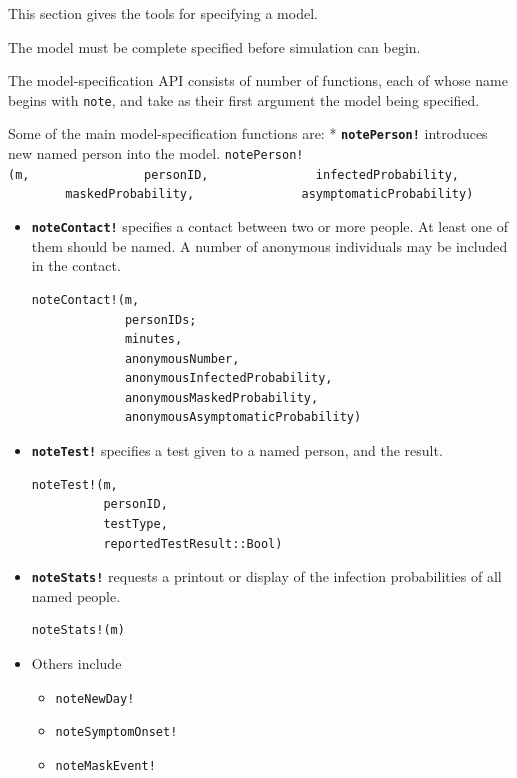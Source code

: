 \documentclass[11pt]{article}
\providecommand{\tightlist}{%
      \setlength{\itemsep}{0pt}\setlength{\parskip}{0pt}}
\begin{document}
This section gives the tools for specifying a model.

The model must be complete specified before simulation can begin.

The model-specification API consists of number of functions, each of
whose name begins with \texttt{note}, and take as their first argument
the model being specified.

Some of the main model-specification functions are: *
\textbf{\texttt{notePerson!}} introduces new named person into the
model.
\texttt{notePerson!(m,\ \ \ \ \ \ \ \ \ \ \ \ \ \ \ \ personID,\ \ \ \ \ \ \ \ \ \ \ \ \ \ \ infectedProbability,\ \ \ \ \ \ \ \ \ \ \ \ \ \ \ maskedProbability,\ \ \ \ \ \ \ \ \ \ \ \ \ \ \ asymptomaticProbability)}

\begin{itemize}
\item
  \textbf{\texttt{noteContact!}} specifies a contact between two or more
  people. At least one of them should be named. A number of anonymous
  individuals may be included in the contact.

\begin{verbatim}
noteContact!(m,
             personIDs;
             minutes,
             anonymousNumber,
             anonymousInfectedProbability,
             anonymousMaskedProbability,
             anonymousAsymptomaticProbability)
\end{verbatim}
\item
  \textbf{\texttt{noteTest!}} specifies a test given to a named person,
  and the result.

\begin{verbatim}
noteTest!(m,
          personID,
          testType,
          reportedTestResult::Bool)
\end{verbatim}
\item
  \textbf{\texttt{noteStats!}} requests a printout or display of the
  infection probabilities of all named people.

\begin{verbatim}
noteStats!(m)
\end{verbatim}
\item
  Others include

  \begin{itemize}
  \tightlist
  \item
    \texttt{noteNewDay!}
  \item
    \texttt{noteSymptomOnset!}
  \item
    \texttt{noteMaskEvent!}
  \end{itemize}
\end{itemize}
\end{document}
